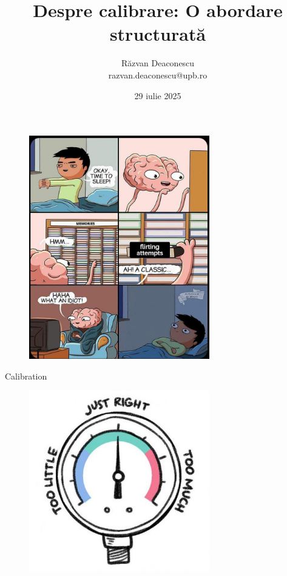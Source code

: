\documentclass{simple}
\title[Despre calibrare]{Despre calibrare: O abordare structurată}
\institute{InfoEducație 2025 (CNU, Focșani)}
\author[Răzvan Deaconescu]{Răzvan Deaconescu \\
razvan.deaconescu@upb.ro}
\date{29 iulie 2025}
\begin{document}
\frame{\titlepage}

\begin{frame}{}
  \begin{figure}
    \centering
    \includegraphics[width=0.7\textwidth]{img/flirting-attempts.png}
  \end{figure}
\end{frame}

\begin{frame}{Calibration}
  \begin{figure}
    \centering
    \includegraphics[width=0.7\textwidth]{img/calibration.jpg}
  \end{figure}
\end{frame}
\end{document}
